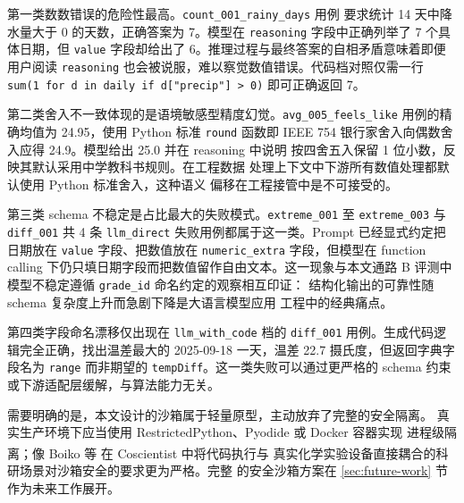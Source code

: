 \documentclass[a4paper]{article}
\theoremstyle{definition}
\theoremstyle{plain}
\theoremstyle{remark}
\newcommand{\reffig}[1]{图 \ref{#1}}
\newcommand{\reftab}[1]{表 \ref{#1}}
\let\oldcite\cite
\renewcommand{\cite}[1]{\textsuperscript{\oldcite{#1}}}
\newcommand{\bk}{\discretionary{}{}{}}
\begin{document}
第一类数数错误的危险性最高。\texttt{count\_\bk{}001\_\bk{}rainy\_\bk{}days} 用例
要求统计 14 天中降水量大于 0 的天数，正确答案为 7。模型在
\texttt{reasoning} 字段中正确列举了 7 个具体日期，但 \texttt{value}
字段却给出了 6。推理过程与最终答案的自相矛盾意味着即便用户阅读
\texttt{reasoning} 也会被说服，难以察觉数值错误。代码档对照仅需一行
\texttt{sum(1 for d in daily if d["precip"] > 0)} 即可正确返回 7。

第二类舍入不一致体现的是语境敏感型精度幻觉。\texttt{avg\_\bk{}005\_\bk{}feels\_\bk{}like}
用例的精确均值为 24.95，使用 Python 标准 \texttt{round} 函数即 IEEE 754
银行家舍入向偶数舍入应得 24.9。模型给出 25.0 并在 reasoning 中说明
按四舍五入保留 1 位小数，反映其默认采用中学教科书规则。在工程数据
处理上下文中下游所有数值处理都默认使用 Python 标准舍入，这种语义
偏移在工程接管中是不可接受的。

第三类 schema 不稳定是占比最大的失败模式。\texttt{extreme\_\bk{}001} 至
\texttt{extreme\_\bk{}003} 与 \texttt{diff\_\bk{}001} 共 4 条 \texttt{llm\_\bk{}direct}
失败用例都属于这一类。Prompt 已经显式约定把日期放在 \texttt{value}
字段、把数值放在 \texttt{numeric\_\bk{}extra} 字段，但模型在 function
calling 下仍只填日期字段而把数值留作自由文本。这一现象与本文通路 B
评测中模型不稳定遵循 \texttt{grade\_\bk{}id} 命名约定的观察相互印证：
结构化输出的可靠性随 schema 复杂度上升而急剧下降是大语言模型应用
工程中的经典痛点。

第四类字段命名漂移仅出现在 \texttt{llm\_\bk{}with\_\bk{}code} 档的
\texttt{diff\_\bk{}001} 用例。生成代码逻辑完全正确，找出温差最大的
2025-09-18 一天，温差 22.7 摄氏度，但返回字典字段名为 \texttt{range}
而非期望的 \texttt{tempDiff}。这一类失败可以通过更严格的 schema 约束
或下游适配层缓解，与算法能力无关。

需要明确的是，本文设计的沙箱属于轻量原型，主动放弃了完整的安全隔离。
真实生产环境下应当使用 RestrictedPython、Pyodide 或 Docker 容器实现
进程级隔离；像 Boiko 等 \cite{ref23} 在 Coscientist 中将代码执行与
真实化学实验设备直接耦合的科研场景对沙箱安全的要求更为严格。完整
的安全沙箱方案在 \ref{sec:future-work} 节作为未来工作展开。


﻿%
\end{document}
